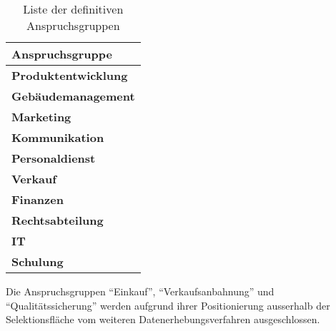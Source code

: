 \documentclass[../../main.tex]{subfiles}
\begin{document}
\begin{table}[H]
\tablefontsize	
\caption{Liste der definitiven Anspruchsgruppen}
\label{definitive_anspruchsgruppen}


\begin{tabular}{ |p{8cm}| }


\hline
\tableheaderbgcolor
\textbf{Anspruchsgruppe} \\ 
\hline


\textbf{Produktentwicklung}             \\ \hline
\textbf{Gebäudemanagement}              \\ \hline
\textbf{Marketing}                      \\ \hline
\textbf{Kommunikation}                  \\ \hline
\textbf{Personaldienst}                 \\ \hline
\textbf{Verkauf}                        \\ \hline
\textbf{Finanzen}                       \\ \hline
\textbf{Rechtsabteilung}                \\ \hline
\textbf{IT}                             \\ \hline
\textbf{Schulung}                       \\ \hline

\end{tabular}
\end{table}

\begin{sloppypar}
Die Anspruchsgruppen "`Einkauf"', "`Verkaufsanbahnung"' und "`Qualitätssicherung"' werden aufgrund ihrer Positionierung ausserhalb der Selektionsfläche vom weiteren Datenerhebungsverfahren ausgeschlossen.
\end{sloppypar}
\end{document}
